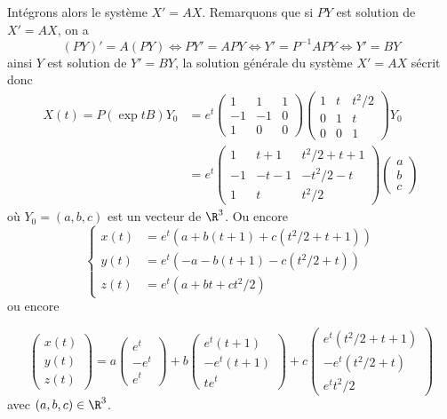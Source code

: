 {\begin{enumerate}
{Int\'egrons alors le syst\`eme $X'=AX$. Remarquons que si $PY$ est solution de $X'=AX$, on a 
$$(PY)'=A(PY)\iff PY'=APY\iff Y'=P^{-1}APY\iff Y'=BY$$
ainsi $Y$ est solution de $Y'=BY$, la solution g\'en\'erale du syst\`eme $X'=AX$ s\'ecrit donc
$$\begin{align*}X(t)=P(\exp tB)Y_0&=e^t\begin{pmatrix}1& 1 &1 \\  -1&-1&0 \\ 1&0&0\end{pmatrix}\begin{pmatrix}1&t&t^2/2 \\ 0&1&t \\ 0&0&1\end{pmatrix}Y_0 \\  &=e^t
\begin{pmatrix}1& t+1& t^2/2+t+1 \\  -1&-t-1&-t^2/2-t \\  1&t&t^2/2\end{pmatrix}\begin{pmatrix}a \\  b \\  c\end{pmatrix}\end{align*}$$
o\`u $Y_0=(a,b,c)$ est un vecteur de $\R^3$. Ou encore
$$\left\{\begin{align*}
x(t)&=e^t(a+b(t+1)+c(t^2/2+t+1)) \\  y(t)&=e^t(-a-b(t+1)-c(t^2/2+t)) \\  z(t)&=e^t(a+bt+ct^2/2)
\end{align*}\right.$$ ou encore

$$\begin{pmatrix}x(t) \\  y(t) \\  z(t)\end{pmatrix}=a\begin{pmatrix}e^t \\  -e^t \\  e^t\end{pmatrix}+
b\begin{pmatrix}e^t(t+1) \\  -e^t(t+1) \\  te^t\end{pmatrix}+c\begin{pmatrix}e^t(t^2/2+t+1) \\  -e^t(t^2/2+t) \\  e^t t^2/2\end{pmatrix}$$
avec $(a,b,c)\in\R^3$.}
\end{enumerate}
}